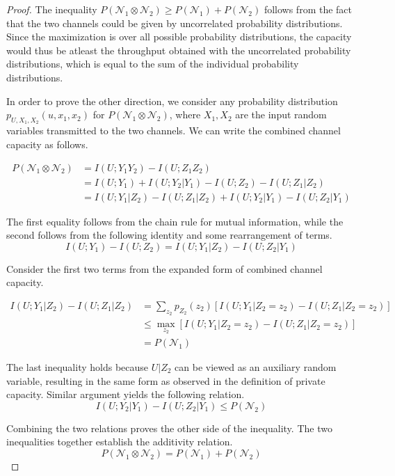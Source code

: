 \begin{proof}
The inequality $P(\mathcal{N}_1 \otimes \mathcal{N}_2) \geq P(\mathcal{N}_1) + P(\mathcal{N}_2)$ follows from the fact that the two channels could be given by uncorrelated probability distributions. Since the maximization is over all possible probability distributions, the capacity would thus be atleast the throughput obtained with the uncorrelated probability distributions, which is equal to the sum of the individual probability distributions.

In order to prove the other direction, we consider any probability distribution $p_{U, X_1, X_2}(u, x_1, x_2)$ for $P(\mathcal{N}_1 \otimes \mathcal{N}_2)$, where $X_1, X_2$ are the input random variables transmitted to the two channels. We can write the combined channel capacity as follows.

\begin{align*}
P(\mathcal{N}_1 \otimes \mathcal{N}_2) &= I(U; Y_1 Y_2) - I(U; Z_1 Z_2) \\
&= I(U; Y_1) + I(U; Y_2 | Y_1) - I(U; Z_2) - I(U; Z_1 | Z_2) \\
&= I(U; Y_1 | Z_2) - I(U; Z_1 | Z_2) + I(U; Y_2 | Y_1) - I(U; Z_2 | Y_1)
\end{align*}

The first equality follows from the chain rule for mutual information, while the second follows from the following identity and some rearrangement of terms.
$$I(U; Y_1) - I(U; Z_2) = I(U; Y_1 | Z_2) - I(U; Z_2 | Y_1)$$

Consider the first two terms from the expanded form of combined channel capacity.

\begin{align*}
I(U; Y_1 | Z_2) - I(U; Z_1 | Z_2) &= \sum_{z_2} p_{Z_2}(z_2) [I(U; Y_1 | Z_2 = z_2) - I(U; Z_1 | Z_2 = z_2)] \\
&\leq \max_{z_2} [I(U; Y_1 | Z_2 = z_2) - I(U; Z_1 | Z_2 = z_2)] \\
&= P(\mathcal{N}_1)
\end{align*}

The last inequality holds because $U | Z_2$ can be viewed as an auxiliary random variable, resulting in the same form as observed in the definition of private capacity. Similar argument yields the following relation.
$$I(U; Y_2 | Y_1) - I(U; Z_2 | Y_1) \leq P(\mathcal{N}_2)$$

Combining the two relations proves the other side of the inequality. The two inequalities together establish the additivity relation.
$$P(\mathcal{N}_1 \otimes \mathcal{N}_2) = P(\mathcal{N}_1) + P(\mathcal{N}_2)$$
\end{proof}

